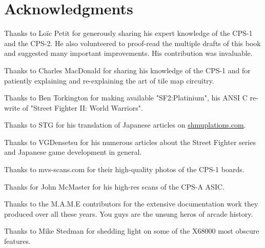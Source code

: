 \chapter*{Acknowledgments} 

Thanks to Lo\"{i}c Petit for generously sharing his expert knowledge of the CPS-1 and the CPS-2. He also volunteered to proof-read the multiple drafts of this book and suggested many important improvements. His contribution was invaluable.

Thanks to Charles MacDonald for sharing his knowledge of the CPS-1 and for patiently explaining and re-explaining the art of tile map circuitry.

Thanks to Ben Torkington for making available "SF2:Platinium", his ANSI C re-write of "Street Fighter II: World Warriors".

Thanks to STG for his translation of Japanese articles on \href{https://shmuplations.com}{shmuplations.com}.

Thanks to VGDensetsu for his numerous articles about the Street Fighter series and Japanese game development in general.

Thanks to mvs-scans.com for their high-quality photos of the CPS-1 boards.

Thanks for John McMaster for his high-res scans of the CPS-A ASIC.

Thanks to the M.A.M.E contributors for the extensive documentation work they produced over all these years. You guys are the unsung heros of arcade history.

Thanks to Mike Stedman for shedding light on some of the X68000 most obscure features.